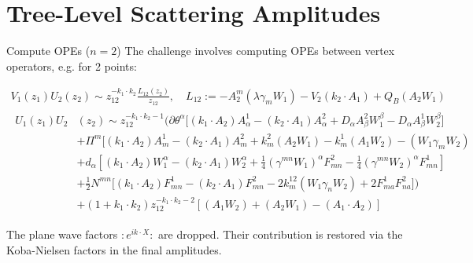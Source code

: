 \documentclass{beamer}
\begin{document}
\section[Disk amp]{Tree-Level Scattering Amplitudes}
\begin{frame}[allowframebreaks]{Compute OPEs ($n=2$)}
The challenge involves computing OPEs between vertex operators, e.g. for 2 points:
\begin{scriptsize}
\begin{equation*}
	\begin{gathered}
		V_1(z_1)U_2(z_2)\sim z_{12}^{-k_1\cdot k_2}\frac{L_{12}(z_2)}{z_{12}},\quad L_{12}:=-A_2^m(\lambda\gamma_mW_1)-V_2(k_2\cdot A_1)+Q_B(A_2W_1)\\
		\begin{aligned}
			U_1(z_1)U_2&(z_2)\sim z_{12}^{-k_1\cdot k_2-1}\Big(\partial\theta^\alpha\bigg[(k_1\cdot A_2)A_\alpha^1-(k_2\cdot A_1)A_\alpha^2+D_\alpha A_\beta^2W_1^\beta-D_\alpha A_\beta^1W_2^\beta\bigg]\\
			&+\Pi^m\bigg[(k_1\cdot A_2)A_m^1-(k_2\cdot A_1)A_m^2+k_m^2(A_2W_1)-k_m^1(A_1W_2)-(W_1\gamma_mW_2)\\
			&+d_\alpha\left[(k_1\cdot A_2)W_1^\alpha-(k_2\cdot A_1)W_2^\alpha+\frac{1}{4}(\gamma^{mn}W_1)^\alpha F_{mn}^2-\frac{1}{4}(\gamma^{mn}W_2)^\alpha F_{mn}^1\right]\\
			&+\frac{1}{2}N^{mn}\Big[(k_1\cdot A_2)F_{mn}^1-(k_2\cdot A_1)F_{mn}^2-2k_m^{12}(W_1\gamma_nW_2)+2F_{ma}^1F_{na}^2\Big]\Big)\\
			&+ (1+k_1\cdot k_2)z_{12}^{-k_1\cdot k_2-2}\left[(A_1W_2)+(A_2W_1)-(A_1\cdot A_2)\right]
		\end{aligned}
	\end{gathered}
\end{equation*}
\end{scriptsize}
The plane wave factors $:e^{ik\cdot X}:$ are dropped. Their contribution is restored via the Koba-Nielsen factors in the final amplitudes.


\end{frame}
\end{document}
